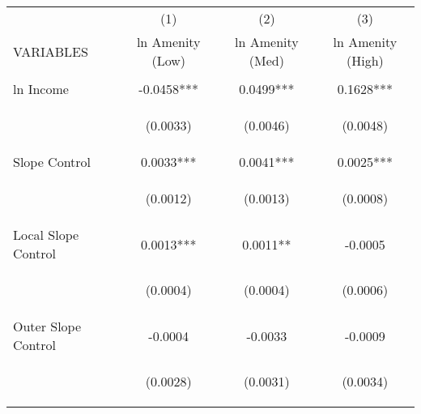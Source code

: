 
\begin{tabular}{lccc} \hline
 & (1) & (2) & (3) \\
VARIABLES & ln Amenity (Low) & ln Amenity (Med) & ln Amenity (High) \\ \hline
\vspace{4pt} & \begin{footnotesize}\end{footnotesize} & \begin{footnotesize}\end{footnotesize} & \begin{footnotesize}\end{footnotesize} \\
ln Income & -0.0458*** & 0.0499*** & 0.1628*** \\
\vspace{4pt} & \begin{footnotesize}(0.0033)\end{footnotesize} & \begin{footnotesize}(0.0046)\end{footnotesize} & \begin{footnotesize}(0.0048)\end{footnotesize} \\
Slope Control & 0.0033*** & 0.0041*** & 0.0025*** \\
\vspace{4pt} & \begin{footnotesize}(0.0012)\end{footnotesize} & \begin{footnotesize}(0.0013)\end{footnotesize} & \begin{footnotesize}(0.0008)\end{footnotesize} \\
Local Slope Control & 0.0013*** & 0.0011** & -0.0005 \\
\vspace{4pt} & \begin{footnotesize}(0.0004)\end{footnotesize} & \begin{footnotesize}(0.0004)\end{footnotesize} & \begin{footnotesize}(0.0006)\end{footnotesize} \\
Outer Slope Control & -0.0004 & -0.0033 & -0.0009 \\
 & \begin{footnotesize}(0.0028)\end{footnotesize} & \begin{footnotesize}(0.0031)\end{footnotesize} & \begin{footnotesize}(0.0034)\end{footnotesize} \\

\end{tabular}
